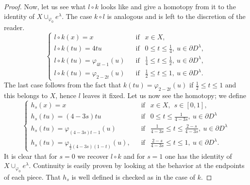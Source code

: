 \begin{proof}
    Now, let us see what $l\circ k$ looks like and give a homotopy from it to the identity of $X\cup_{\varphi_0} e^{\lambda}$. The case $k\circ l$ is analogous and is left to the discretion of the reader.
    \begin{equation*}
        \begin{cases}
            l\circ k(x) = x &~~\text{ if }~~ x\in X,\\
            l\circ k(tu) = 4tu &~~\text{ if }~~ 0\le t\le \frac{1}{4},~u\in \partial D^{\lambda},\\
            l\circ k(tu) = \varphi_{4t-1}(u) &~~\text{ if }~~  \frac{1}{4} \le t\le \frac{1}{2},~u\in \partial D^{\lambda},\\
            l\circ k(tu) = \varphi_{2-2t}(u) &~~\text{ if }~~  \frac{1}{2} \le t\le 1,~u\in \partial D^{\lambda}.
        \end{cases}
    \end{equation*}
    The last case follows from the fact that $k(tu) = \varphi_{2-2t}(u)$ if $\frac{1}{2} \le t\le 1$ and this belongs to $X$, hence $l$ leaves it fixed. Let us now see the homotopy; we define
    \begin{equation*}
    \begin{cases}
        h_s(x) = x &~~\text{ if }~~ x\in X, ~~s\in[0,1],\\[4pt]
        h_s(tu) = (4-3s)tu &~~\text{ if }~~ 0 \le t \le \frac{1}{4-3s},~u\in \partial D^{\lambda} \\[4pt]
        h_s(tu) = \varphi_{(4-3s)t-1}(u) &~~\text{ if }~~ \frac{1}{4-3s} \le t \le \frac{2-s}{4-3s},~u\in \partial D^{\lambda} \\[4pt]
        h_s(tu) = \varphi_{\frac{1}{2}(4-3s)(1-t)}(u),
        &~~\text{ if }~~  \frac{2-s}{4-3s} \le t \le 1,~u\in \partial D^{\lambda}.
    \end{cases}
    \end{equation*}
    It is clear that for $s=0$ we recover $l\circ k$ and for $s=1$ one has the identity of $X\cup_{\varphi_0} e^{\lambda}$. Continuity is easily proven by looking at the behavior at the endpoints of each piece. That $h_s$ is well defined is checked as in the case of $k$.

\end{proof}
\bigskip

